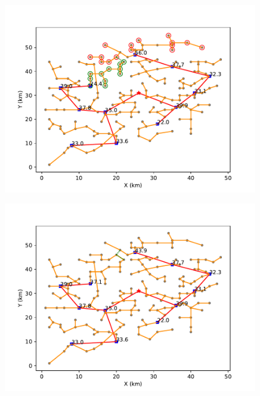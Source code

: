 \documentclass{cumcmthesis}
\begin{document}
  \begin{figure}[!h]
    \centering
    \begin{minipage}[c]{0.45\textwidth}
        \centering
        \includegraphics[width=0.99\textwidth]{figure/pipline_graft_connection_6.pdf}
        \label{fig:pipline_graft_connection_6}
    \end{minipage}
    \begin{minipage}[c]{0.45\textwidth}
        \centering
        \includegraphics[width=0.99\textwidth]{figure/pipline_graft_cut_6.pdf}
        \label{fig:pipline_graft_cut_6}
    \end{minipage}
  \end{figure}
  
\end{document}
